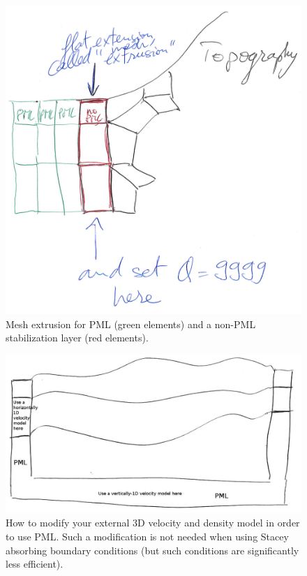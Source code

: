 \begin{figure}[htbp]
\noindent \begin{centering}
\includegraphics[width=4.5in]{figures/how_to_use_a_transition_mesh_layer_to_stabilize_PML.png}
\par\end{centering}
\caption{Mesh extrusion for PML (green elements) and a non-PML stabilization layer (red elements).}
\label{fig:mesh_extrusion}
\end{figure}

\begin{figure}[htbp]
\noindent \begin{centering}
\includegraphics[width=6in]{figures/how_to_use_PML_when_a_tomographic_velocity_model_is_used.png}
\par\end{centering}
\caption{How to modify your external 3D velocity and density model in order
to use PML. Such a modification is not needed when using Stacey absorbing
boundary conditions (but such conditions are significantly less efficient).}
\label{fig:modify_external_velocity_model_to_use_PML}
\end{figure}


